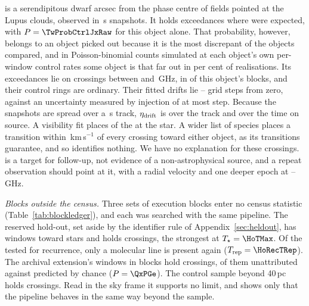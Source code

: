 \BkAlmaName{} is a serendipitous dwarf \TwPbJx{} arcsec from the phase
centre of fields pointed at the Lupus clouds, observed in \TwOnSrcJx\,s
snapshots. It holds \TwNExcJx{} exceedances where \TwExpCtrlJx{} were
expected, with $P=\TwProbCtrlJxRaw$ for this object alone. That probability,
however, belongs to an object picked out because it is the most discrepant of
the \TwLookNStarCtrl{} objects compared, and in Poisson-binomial counts
simulated at each object's own per-window control rates some object is that
far out in \TwLookPctCtrl{} per cent of realisations. Its
\TwNExcJxWord{} exceedances lie on \TwJxNCrossExcWord{} crossings between
\TwJxExcBandLo{} and \TwJxExcBandHi\,GHz, in \TwJxNBlockExcWord{} of this
object's \TwJxNBlockWord{} blocks, and their control rings are ordinary.
Their fitted drifts lie \TwJxStepLo--\TwJxStepHi{} grid steps from zero,
against an uncertainty measured by injection of at most \TwJxStepErr{} step.
Because the snapshots are spread over a \TwJxSpanS\,s track,
$\eta_{\rm drift}$ is \TwJxEtaSpanRange{} over the track and \TwJxEtaOnRange{}
over the time on source. A visibility fit places \TwJxNLocalExcWord{} of the
\TwJxNCrossExcWord{} at the star. A wider list of \TwWideNSpecies{} species
places a transition within \TwWideDvMax\,km\,s$^{-1}$ of every crossing
toward either object, as its \TwWideNTrans{} transitions guarantee, and so
identifies nothing. We have no explanation for these crossings. \BkAlmaName{}
is a target for follow-up, not evidence of a non-astrophysical source, and a
repeat observation should point at it, with a radial velocity and one deeper
epoch at \TwJxExcBandLo--\TwJxExcBandHi\,GHz.

\label{sec:holdoutsearch}%
\emph{Blocks outside the census.} Three sets of execution blocks enter no
census statistic (Table~\ref{tab:blockledger}), and each was searched with
the same pipeline. The reserved hold-out, set aside by the identifier rule
of Appendix~\ref{sec:heldout}, has \HoNWin{} windows toward \HoNStar{} stars
and holds \HoNCross{} crossings, the strongest at $T_\star=\HoTMax$. Of the \HoNTested{} tested for recurrence,
only a molecular line is present again ($T_{\rm rep}=\HoRecTRep$). The
archival extension's \LdgExtWin{} windows in \LdgExtEB{} blocks hold
\QxObsCross{} crossings, \QxObsUnattr{} of them unattributed against
\QxLam{} predicted by chance ($P=\QxPGe$). The control sample beyond
40\,pc holds \OosNCross{} crossings. Read in the sky frame it supports no
limit, and shows only that the pipeline behaves in the same way beyond the
sample.

